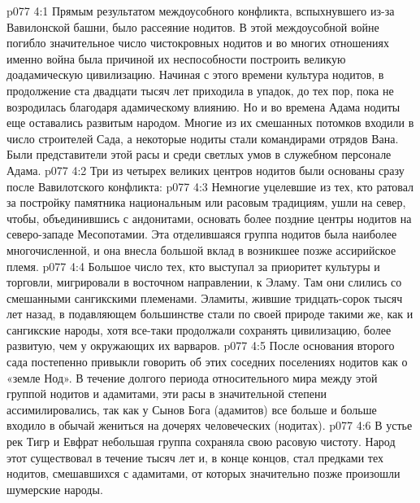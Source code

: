 \vs p077 4:1 Прямым результатом междоусобного конфликта, вспыхнувшего из\hyp{}за Вавилонской башни, было рассеяние нодитов. В этой междоусобной войне погибло значительное число чистокровных нодитов и во многих отношениях именно война была причиной их неспособности построить великую доадамическую цивилизацию. Начиная с этого времени культура нодитов, в продолжение ста двадцати тысяч лет приходила в упадок, до тех пор, пока не возродилась благодаря адамическому влиянию. Но и во времена Адама нодиты еще оставались развитым народом. Многие из их смешанных потомков входили в число строителей Сада, а некоторые нодиты стали командирами отрядов Вана. Были представители этой расы и среди светлых умов в служебном персонале Адама.
\vs p077 4:2 Три из четырех великих центров нодитов были основаны сразу после Вавилотского конфликта:
\vs p077 4:3 \bibnobreakspace {} Немногие уцелевшие из тех, кто ратовал за постройку памятника национальным или расовым традициям, ушли на север, чтобы, объединившись с андонитами, основать более поздние центры нодитов на северо\hyp{}западе Месопотамии. Эта отделившаяся группа нодитов была наиболее многочисленной, и она внесла большой вклад в возникшее позже ассирийское племя.
\vs p077 4:4 \pc {}\bibnobreakspace {} Большое число тех, кто выступал за приоритет культуры и торговли, мигрировали в восточном направлении, к Эламу. Там они слились со смешанными сангикскими племенами. Эламиты, жившие тридцать\hyp{}сорок тысяч лет назад, в подавляющем большинстве стали по своей природе такими же, как и сангикские народы, хотя все\hyp{}таки продолжали сохранять цивилизацию, более развитую, чем у окружающих их варваров.
\vs p077 4:5 После основания второго сада постепенно привыкли говорить об этих соседних поселениях нодитов как о «земле Нод». В течение долгого периода относительного мира между этой группой нодитов и адамитами, эти расы в значительной степени ассимилировались, так как у Сынов Бога (адамитов) все больше и больше входило в обычай жениться на дочерях человеческих (нодитах).
\vs p077 4:6 \pc {}\bibnobreakspace {} В устье рек Тигр и Евфрат небольшая группа сохраняла свою расовую чистоту. Народ этот существовал в течение тысяч лет и, в конце концов, стал предками тех нодитов, смешавшихся с адамитами, от которых значительно позже произошли шумерские народы.
